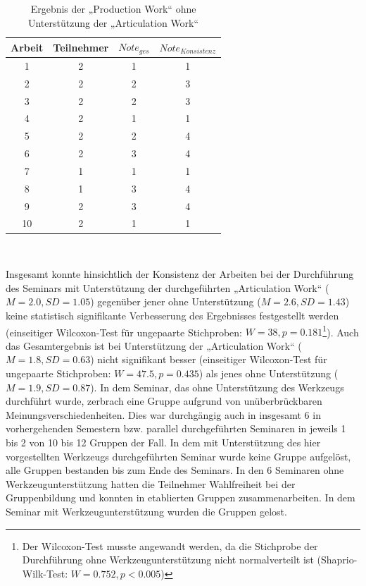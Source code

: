 \begin{table}[htbp]
	\centering
	\caption{Ergebnis der „Production Work“ ohne Unterstützung der „Articulation Work“}

\begin{tabular}{| c || c || c | c |}
  \hline
   Arbeit & Teilnehmer & $Note_{ges}$ & $Note_{Konsistenz}$ \\ \hline
   1         & 2 & 1 & 1 \\ 
   2         & 2 & 2 & 3 \\ 
   3         & 2 & 2 & 3 \\ 
   4         & 2 & 1 & 1 \\ 
   5         & 2 & 2 & 4 \\ 
   6         & 2 & 3 & 4 \\ 
   7         & 1 & 1 & 1 \\ 
   8         & 1 & 3 & 4 \\ 
   9         & 2 & 3 & 4 \\ 
   10        & 2 & 1 & 1 \\ \hline
\end{tabular} \\ 
	\label{tab:ergebnis_ohne}
\end{table}

Insgesamt konnte hinsichtlich der Konsistenz der Arbeiten bei der Durchführung des Seminars mit Unterstützung der durchgeführten „Articulation Work“ ($M=2.0, SD=1.05$) gegenüber jener ohne Unterstützung ($M=2.6, SD=1.43$) keine statistisch signifikante Verbesserung des Ergebnisses festgestellt werden (einseitiger Wilcoxon-Test für ungepaarte Stichproben: $W=38, p=0.181$\footnote{Der Wilcoxon-Test musste angewandt werden, da die Stichprobe der Durchführung ohne Werkzeugunterstützung nicht normalverteilt ist (Shaprio-Wilk-Test: $W=0.752, p<0.005$)}). Auch das Gesamtergebnis ist bei Unterstützung der „Articulation Work“ ($M=1.8, SD=0.63$) nicht signifikant besser (einseitiger Wilcoxon-Test für ungepaarte Stichproben: $W=47.5, p=0.435$) als jenes ohne Unterstützung ($M=1.9, SD=0.87$). In dem Seminar, das ohne Unterstützung des Werkzeugs durchführt wurde, zerbrach eine Gruppe aufgrund von unüberbrückbaren Meinungsverschiedenheiten. Dies war durchgängig auch in insgesamt 6 in vorhergehenden Semestern bzw. parallel durchgeführten Seminaren in jeweils 1 bis 2 von 10 bis 12 Gruppen der Fall. In dem mit Unterstützung des hier vorgestellten Werkzeugs durchgeführten Seminar wurde keine Gruppe aufgelöst, alle Gruppen bestanden bis zum Ende des Seminars. In den 6 Seminaren ohne Werkzeugunterstützung hatten die Teilnehmer Wahlfreiheit bei der Gruppenbildung und konnten in etablierten Gruppen zusammenarbeiten. In dem Seminar mit Werkzeugunterstützung wurden die Gruppen gelost.

